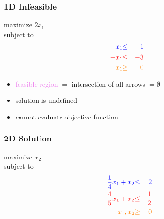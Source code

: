\documentclass{beamer}
\begin{document}
\begin{frame} \frametitle{1D Infeasible}
  maximize $2 x_1$ \\
  subject to
  \begin{eqnarray*}
    \textcolor{blue}{x_1} &\textcolor{blue}{\leq}& \textcolor{blue}{1} \\
    \textcolor{red}{-x_1} &\textcolor{red}{\leq}& \textcolor{red}{-3} \\
    \textcolor{orange}{x_1} &\textcolor{orange}{\geq}& \textcolor{orange}{0}
  \end{eqnarray*}

  \begin{center}
  \end{center}
  \begin{itemize}
    \item \textcolor{violet}{feasible region} $=$ intersection of all arrows
      $= \emptyset$
    \item solution is undefined
    \item cannot evaluate objective function
  \end{itemize}

\end{frame}

\begin{frame} \frametitle{2D Solution}
  maximize $x_2$ \\
  subject to
  \begin{eqnarray*}
    \textcolor{blue}{\frac{1}{4} x_1 + x_2} &\textcolor{blue}{\leq}& \textcolor{blue}{2} \\
    \textcolor{red}{-\frac{4}{5} x_1 + x_2} &\textcolor{red}{\leq}& \textcolor{red}{\frac{1}{2}} \\
    \textcolor{orange}{x_1, x_2} &\textcolor{orange}{\geq}& \textcolor{orange}{0}
  \end{eqnarray*}
\end{frame}
\end{document}

